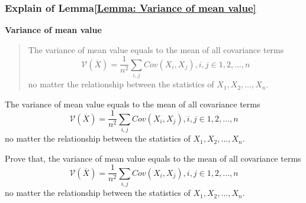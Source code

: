 \documentclass[../concepts.tex]{subfiles}
\begin{document}
\subsubsection{Explain of Lemma\ref{Lemma: Variance of mean value}}
\textbf{Variance of mean value}
\begin{quote}
    The variance of mean value equals to the mean of all covariance terms
    \begin{equation*}
        \mathcal{V}(\overline{X}) =
        \frac{1}{n^2} \sum_{i, j} Cov(X_i, X_j),
        i, j \in 1, 2, \dots, n
    \end{equation*}
    no matter the relationship between the statistics of $X_1, X_2, \dots, X_n$.
\end{quote}


The variance of mean value equals to the mean of all covariance terms
\begin{equation*}
    \mathcal{V}(\overline{X}) =
    \frac{1}{n^2} \sum_{i, j} Cov(X_i, X_j),
    i, j \in 1, 2, \dots, n
\end{equation*}
no matter the relationship between the statistics of $X_1, X_2, \dots, X_n$.


Prove that, the variance of mean value equals to the mean of all covariance terms
\begin{equation*}
    \mathcal{V}(\overline{X}) =
    \frac{1}{n^2} \sum_{i, j} Cov(X_i, X_j),
    i, j \in 1, 2, \dots, n
\end{equation*}
no matter the relationship between the statistics of $X_1, X_2, \dots, X_n$.
\end{document}
